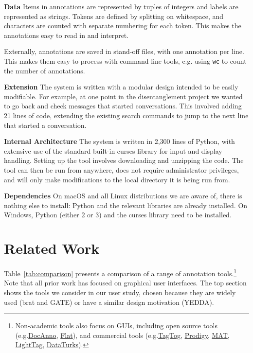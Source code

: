 \documentclass[11pt,a4paper]{article}
\makeatletter
\newcommand{\myeg}{e.g.\@\xspace}
\newcommand{\tightparagraph}[1]{\noindent\textbf{#1}}
\newcommand{\unixcmd}[1]{\texttt{#1}}
\makeatother
\begin{document}
\tightparagraph{Data}
Items in annotations are represented by tuples of integers and labels are represented as strings.
Tokens are defined by splitting on whitespace, and characters are counted with separate numbering for each token.
This makes the annotations easy to read in and interpret.

Externally, annotations are saved in stand-off files, with one annotation per line.
This makes them easy to process with command line tools, \myeg using \unixcmd{wc} to count the number of annotations.

\tightparagraph{Extension}
The system is written with a modular design intended to be easily modifiable.
For example, at one point in the disentanglement project we wanted to go back and check messages that started conversations.
This involved adding 21 lines of code, extending the existing search commands to jump to the next line that started a conversation.

\tightparagraph{Internal Architecture}
The system is written in 2,300 lines of Python, with extensive use of the standard built-in curses library for input and display handling.
Setting up the tool involves downloading and unzipping the code.
The tool can then be run from anywhere, does not require administrator privileges, and will only make modifications to the local directory it is being run from.

\tightparagraph{Dependencies}
On macOS and all Linux distributions we are aware of, there is nothing else to install: Python and the relevant libraries are already installed.
On Windows, Python (either 2 or 3) and the curses library need to be installed.

\section{Related Work}

Table~\ref{tab:comparison} presents a comparison of a range of annotation tools.\footnote{
  Non-academic tools also focus on GUIs, including open source tools
  (\myeg \href{https://github.com/chakki-works/doccano}{DocAnno}, \href{https://github.com/proycon/flat}{Flat}), and  
  commercial tools
  (\myeg \href{https://www.tagtog.net/}{TagTog}, \href{https://prodi.gy/}{Prodigy}, \href{http://mat-annotation.sourceforge.net/}{MAT}, \href{https://www.lighttag.io/}{LightTag}, \href{https://dataturks.com/}{DataTurks}).
}
Note that all prior work has focused on graphical user interfaces.
The top section shows the tools we consider in our user study, chosen because they are widely used (brat and GATE) or have a similar design motivation (YEDDA).
\end{document}
